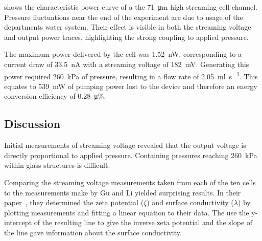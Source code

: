        shows the characteristic power curve of a the \SI{71}{\micro\meter} high streaming cell channel.
      Pressure fluctuations near the end of the experiment are due to usage of the departments water system.
      Their effect is visible in both the streaming voltage and output power traces, highlighting the strong coupling to applied pressure.

      The maximum power delivered by the cell was \SI{1.52}{\nano\watt}, corresponding to a current draw of \SI{33.5}{\nano\ampere} with a streaming voltage of \SI{182}{\milli\volt}.
      Generating this power required \SI{260}{\kilo\pascal} of pressure, resulting in a flow rate of \SI{2.05}{\milli\litre\per\second}.
      This equates to \SI{539}{\milli\watt} of pumping power lost to the device and therefore an energy conversion efficiency of \SI{0.28}{\micro\percent}.


  \subsection{Discussion}


    Initial measurements of streaming voltage revealed that the output voltage is directly proportional to applied pressure.
    Containing pressures reaching \SI{260}{\kilo\pascal} within glass structures is difficult.

    Comparing the streaming voltage measurements taken from each of the ten cells to the measurements make by Gu and Li yielded surprising results.
    In their paper~\cite{Gu2000}, they determined the zeta potential ($\zeta$) and surface conductivity ($\lambda$) by plotting measurements and fitting a linear equation to their data.
    The use the y-intercept of the resulting line to give the inverse zeta potential and the slope of the line gave information about the surface conductivity.

